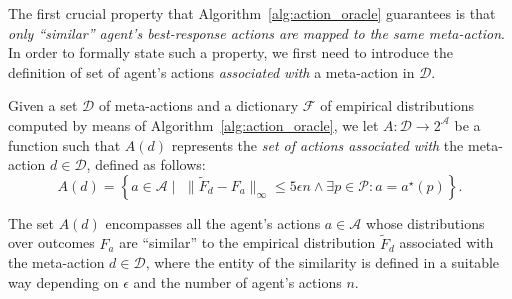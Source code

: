 The first crucial property that Algorithm~\ref{alg:action_oracle} guarantees is that \emph{only ``similar'' agent's best-response actions are mapped to the same meta-action}.
%
In order to formally state such a property, we first need to introduce the definition of set of agent's actions \emph{associated with} a meta-action in $\mathcal{D}$.
%
%
%
%
%
%
%
\begin{definition}\label{def:asssoc_actions}
	Given a set $\mathcal{D}$ of meta-actions and a dictionary $\mathcal{F}$ of empirical distributions computed by means of Algorithm~\ref{alg:action_oracle}, we let $A: \mathcal{D} \to 2^\mathcal{A}$ be a function such that $A(d)$ represents the \emph{set of actions associated with} the meta-action $d \in \mathcal{D}$, defined as follows:
	\[
		A(d) = \left\{a \in \mathcal{A} \mid  \,\, \rVert \widetilde{F}_d -  F_a  \lVert_\infty\le 5 \epsilon n \wedge \exists p \in \mathcal P: a=a^\star(p) \right\}.
	\]
\end{definition}
%
\vspace{-3mm}
The set $A(d)$ encompasses all the agent's actions $a \in \mathcal{A}$ whose distributions over outcomes $F_a$ are ``similar'' to the empirical distribution $\widetilde{F}_d$ associated with the meta-action $d \in \mathcal{D}$, where the entity of the similarity is defined in a suitable way depending on $\epsilon$ and the number of agent's actions $n$.
